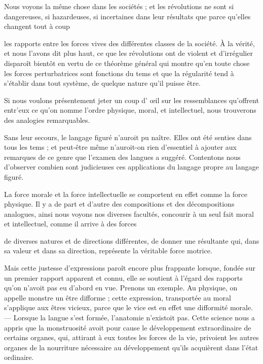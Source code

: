 \documentclass[11pt,a4paper]{article}
\begin{document}
Nous voyons la même chose dans les sociétés ; et les révolutions ne sont si
dangereuses, si hazardeuses, si incertaines dans leur résultats que parce
qu'elles changent tout à coup

les rapports entre les forces vives des différentes classes de la société.
À la vérité, et nous l'avons dit plus haut, ce que les révolutions ont de
violent et d'irrégulier disparoît bientôt en vertu de ce théorème général
qui montre qu'en toute chose les forces perturbatrices sont fonctions du tems
et que la régularité tend à s'établir dans tout système, de quelque nature
qu'il puisse être.

Si nous voulons présentement jeter un coup d' œil sur les
ressemblances qu'offrent entr'eux ce qu'on nomme l'ordre physique, moral, et
intellectuel, nous trouverons des analogies remarquables.

 Sans leur secours, le langage
figuré n'auroit pu naître. Elles ont été senties dans tous les tems ; et peut-être même
n'auroit-on rien d'essentiel à ajouter aux remarques de ce genre que l'examen
des langues a suggéré.  Contentons nous d'observer combien
sont judicieuses ces applications du langage propre au langage figuré.

La force morale et la force intellectuelle se comportent en effet comme la
force physique. Il y a de part et d'autre des compositions et des
décompositions analogues, ainsi nous voyons nos diverses facultés, concourir
à un seul fait moral et intellectuel, comme il arrive à des forces

de  diverses natures et de directions différentes, de
donner une résultante qui, dans sa valeur et dans sa direction, représente la
véritable force motrice.

Mais cette justesse d'expressions paroît encore plus frappante lorsque,
fondée  sur un premier rapport apparent et connu, elle se
soutient à l'égard des rapports qu'on n'avoit pas eu  d'abord
en vue. Prenons un exemple. Au physique, on appelle monstre un être
difforme ; cette expression, transportée au moral s'applique aux êtres
vicieux, parce que le vice est en effet une difformité morale. --- Lorsque
la langue s'est formée, l'anatomie n'existoit pas. Cette science nous a
appris que la monstruosité avoit pour cause le développement extraordinaire
de certains organes, qui, attirant à eux toutes les forces de la vie,
privoient les autres organes de la nourriture nécessaire au développement
qu'ils acquièrent dans l'état ordinaire.
\end{document}
